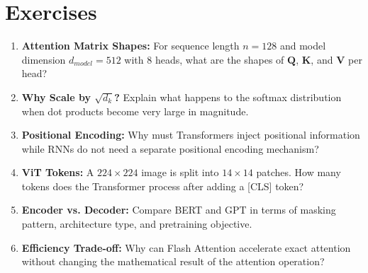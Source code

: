 \section{Exercises}

\begin{enumerate}
    \item \textbf{Attention Matrix Shapes:} For sequence length $n=128$ and model dimension $d_{model}=512$ with 8 heads, what are the shapes of $\mathbf{Q}$, $\mathbf{K}$, and $\mathbf{V}$ per head?

    \item \textbf{Why Scale by $\sqrt{d_k}$?} Explain what happens to the softmax distribution when dot products become very large in magnitude.

    \item \textbf{Positional Encoding:} Why must Transformers inject positional information while RNNs do not need a separate positional encoding mechanism?

    \item \textbf{ViT Tokens:} A $224\times224$ image is split into $14\times14$ patches. How many tokens does the Transformer process after adding a [CLS] token?

    \item \textbf{Encoder vs. Decoder:} Compare BERT and GPT in terms of masking pattern, architecture type, and pretraining objective.

    \item \textbf{Efficiency Trade-off:} Why can Flash Attention accelerate exact attention without changing the mathematical result of the attention operation?
\end{enumerate}

